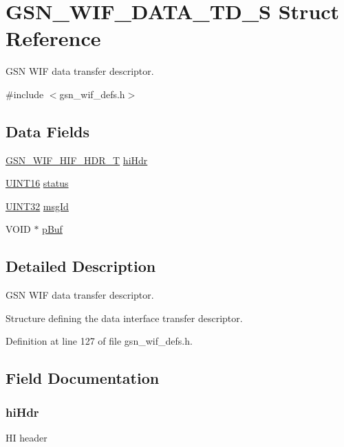 \hypertarget{a00325}{
\section{GSN\_\-WIF\_\-DATA\_\-TD\_\-S Struct Reference}
\label{a00325}
}


GSN WIF data transfer descriptor.  




{\ttfamily \#include $<$gsn\_\-wif\_\-defs.h$>$}

\subsection*{Data Fields}
\begin{DoxyCompactItemize}
\item 
\hyperlink{a00337}{GSN\_\-WIF\_\-HIF\_\-HDR\_\-T} \hyperlink{a00325_ad9d6e8525242b101d86e51ace71914d3}{hiHdr}
\item 
\hyperlink{a00660_ga09f1a1fb2293e33483cc8d44aefb1eb1}{UINT16} \hyperlink{a00325_ae425f6f53cf8bd844de7aefd5a15798a}{status}
\item 
\hyperlink{a00660_gae1e6edbbc26d6fbc71a90190d0266018}{UINT32} \hyperlink{a00325_ac62e60ec11953cdf626998842aae59ae}{msgId}
\item 
VOID $\ast$ \hyperlink{a00325_ae73880d96d570d584a107c2b4ef84584}{pBuf}
\end{DoxyCompactItemize}


\subsection{Detailed Description}
GSN WIF data transfer descriptor. 

Structure defining the data interface transfer descriptor. 

Definition at line 127 of file gsn\_\-wif\_\-defs.h.



\subsection{Field Documentation}
\hypertarget{a00325_ad9d6e8525242b101d86e51ace71914d3}{
\subsubsection[{hiHdr}]{ {\bf hiHdr}}}
\label{a00325_ad9d6e8525242b101d86e51ace71914d3}
HI header 

